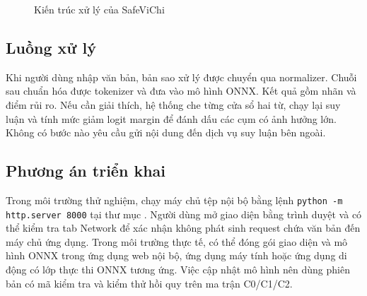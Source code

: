 \documentclass[12pt,a4paper]{article}
\newcommand{\sourcepath}[1]{\texttt{\detokenize{#1}}}
\begin{document}
\begin{figure}[H]
\centering
{}
\caption{Kiến trúc xử lý của SafeViChi}
\label{fig:architecture}
\end{figure}

\subsection{Luồng xử lý}
Khi người dùng nhập văn bản, bản sao xử lý được chuyển qua normalizer. Chuỗi sau chuẩn hóa được tokenizer và đưa vào mô hình ONNX. Kết quả gồm nhãn và điểm rủi ro. Nếu cần giải thích, hệ thống che từng cửa sổ hai từ, chạy lại suy luận và tính mức giảm logit margin để đánh dấu các cụm có ảnh hưởng lớn. Không có bước nào yêu cầu gửi nội dung đến dịch vụ suy luận bên ngoài.

\subsection{Phương án triển khai}
Trong môi trường thử nghiệm, chạy máy chủ tệp nội bộ bằng lệnh \texttt{python -m http.server 8000} tại thư mục \sourcepath{demo/}. Người dùng mở giao diện bằng trình duyệt và có thể kiểm tra tab Network để xác nhận không phát sinh request chứa văn bản đến máy chủ ứng dụng. Trong môi trường thực tế, có thể đóng gói giao diện và mô hình ONNX trong ứng dụng web nội bộ, ứng dụng máy tính hoặc ứng dụng di động có lớp thực thi ONNX tương ứng. Việc cập nhật mô hình nên dùng phiên bản có mã kiểm tra và kiểm thử hồi quy trên ma trận C0/C1/C2.
\end{document}
